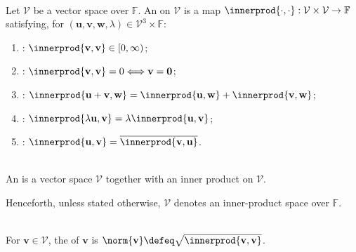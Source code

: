 \begin{definition} \label{def:inner-product} \\
Let $\mathcal{V}$ be a vector space over $\mathbb{F}$. An  on $\mathcal{V}$ is a map $\innerprod{\cdot,\cdot}:\mathcal{V}\times\mathcal{V}\to\mathbb{F}$ satisfying, for $(\mathbf{u},\mathbf{v},\mathbf{w},\lambda)\in\mathcal{V}^3\times\mathbb{F}$:
\begin{enumerate}[label=(\roman*)]
\setlength{\itemsep}{0pt}
\item {}: $\innerprod{\mathbf{v},\mathbf{v}}\in[0,\infty)$;
\item {}: $\innerprod{\mathbf{v},\mathbf{v}}=0\Longleftrightarrow\mathbf{v}=\mathbf{0}$;
\item {}: $\innerprod{\mathbf{u}+\mathbf{v},\mathbf{w}}=\innerprod{\mathbf{u},\mathbf{w}}+\innerprod{\mathbf{v},\mathbf{w}}$;
\item {}: $\innerprod{\lambda\mathbf{u},\mathbf{v}}=\lambda\innerprod{\mathbf{u},\mathbf{v}}$;
\item {}: $\innerprod{\mathbf{u},\mathbf{v}}=\overline{\innerprod{\mathbf{v},\mathbf{u}}}$.
\end{enumerate}
\end{definition}

\begin{definition} \label{def:inner-product-space} \\
An  is a vector space $\mathcal{V}$ together with an inner product on $\mathcal{V}$.
\end{definition}

Henceforth, unless stated otherwise, $\mathcal{V}$ denotes an inner-product space over $\mathbb{F}$.

\begin{definition} \label{def:norm-induced-by-inner-product} \\
For $\mathbf{v}\in\mathcal{V}$, the  of $\mathbf{v}$ is $\norm{\mathbf{v}}\defeq\sqrt{\innerprod{\mathbf{v},\mathbf{v}}}$.
\end{definition}

\begin{illustrationfigure}[H]
  \centering
  
  \caption{The norm is vector length, with $\norm{\mathbf{x}}^2=\innerprod{\mathbf{x},\mathbf{x}}$.}
  \label{fig:inner-product-norm-vector}
\end{illustrationfigure}

